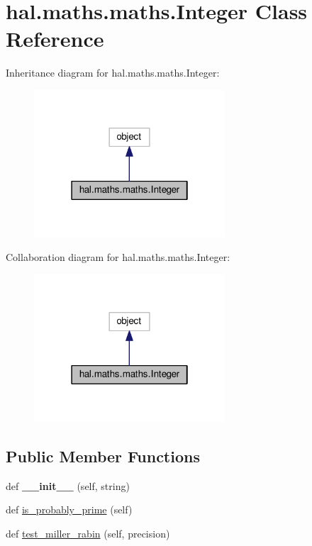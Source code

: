 \hypertarget{classhal_1_1maths_1_1maths_1_1_integer}{}\section{hal.\+maths.\+maths.\+Integer Class Reference}
\label{classhal_1_1maths_1_1maths_1_1_integer}


Inheritance diagram for hal.\+maths.\+maths.\+Integer\+:\nopagebreak
\begin{figure}[H]
\begin{center}
\leavevmode
\includegraphics[width=202pt]{classhal_1_1maths_1_1maths_1_1_integer__inherit__graph}
\end{center}
\end{figure}


Collaboration diagram for hal.\+maths.\+maths.\+Integer\+:\nopagebreak
\begin{figure}[H]
\begin{center}
\leavevmode
\includegraphics[width=202pt]{classhal_1_1maths_1_1maths_1_1_integer__coll__graph}
\end{center}
\end{figure}
\subsection*{Public Member Functions}
\begin{DoxyCompactItemize}
\item 
def {\bfseries \+\_\+\+\_\+init\+\_\+\+\_\+} (self, string)\hypertarget{classhal_1_1maths_1_1maths_1_1_integer_ab02daf8f7df66b9739514805740d2e29}{}\label{classhal_1_1maths_1_1maths_1_1_integer_ab02daf8f7df66b9739514805740d2e29}

\item 
def \hyperlink{classhal_1_1maths_1_1maths_1_1_integer_a813e392f81a6c01f87a9ef8d1c8c1250}{is\+\_\+probably\+\_\+prime} (self)
\item 
def \hyperlink{classhal_1_1maths_1_1maths_1_1_integer_a3cd7d69cc1e8bb8271e61bbeba6d2a50}{test\+\_\+miller\+\_\+rabin} (self, precision)
\end{DoxyCompactItemize}
